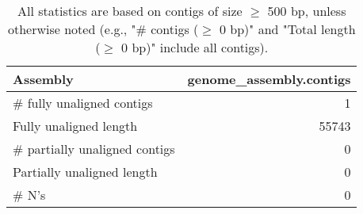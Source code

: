 \documentclass[12pt,a4paper]{article}
\begin{document}
\begin{table}[ht]
\begin{center}
\caption{All statistics are based on contigs of size $\geq$ 500 bp, unless otherwise noted (e.g., "\# contigs ($\geq$ 0 bp)" and "Total length ($\geq$ 0 bp)" include all contigs).}
\begin{tabular}{|l*{1}{|r}|}
\hline
Assembly & genome\_assembly.contigs \\ \hline
\# fully unaligned contigs & 1 \\ \hline
Fully unaligned length & 55743 \\ \hline
\# partially unaligned contigs & 0 \\ \hline
Partially unaligned length & 0 \\ \hline
\# N's & 0 \\ \hline
\end{tabular}
\end{center}
\end{table}
\end{document}
